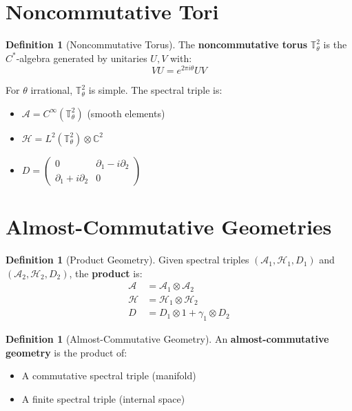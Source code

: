 \documentclass[11pt,a4paper,openright]{book}
\theoremstyle{plain}
\theoremstyle{definition}
\newtheorem{definition}[theorem]{Definition}
\newcommand{\Hil}{\mathcal{H}}
\newcommand{\A}{\mathcal{A}}
\newcommand{\C}{\mathbb{C}}
\begin{document}
\section{Noncommutative Tori}

\begin{definition}[Noncommutative Torus]
The \textbf{noncommutative torus} $\mathbb{T}^2_\theta$ is the $C^*$-algebra generated by unitaries $U, V$ with:
\begin{equation}
VU = e^{2\pi i\theta} UV
\end{equation}
\end{definition}

For $\theta$ irrational, $\mathbb{T}^2_\theta$ is simple. The spectral triple is:
\begin{itemize}
    \item $\A = C^\infty(\mathbb{T}^2_\theta)$ (smooth elements)
    \item $\Hil = L^2(\mathbb{T}^2_\theta) \otimes \C^2$
    \item $D = \begin{pmatrix} 0 & \partial_1 - i\partial_2 \\ \partial_1 + i\partial_2 & 0 \end{pmatrix}$
\end{itemize}

\section{Almost-Commutative Geometries}

\begin{definition}[Product Geometry]
Given spectral triples $(\A_1, \Hil_1, D_1)$ and $(\A_2, \Hil_2, D_2)$, the \textbf{product} is:
\begin{align}
\A &= \A_1 \otimes \A_2 \\
\Hil &= \Hil_1 \otimes \Hil_2 \\
D &= D_1 \otimes 1 + \gamma_1 \otimes D_2
\end{align}
\end{definition}

\begin{definition}[Almost-Commutative Geometry]
An \textbf{almost-commutative geometry} is the product of:
\begin{itemize}
    \item A commutative spectral triple (manifold)
    \item A finite spectral triple (internal space)
\end{itemize}
\end{definition}
\end{document}
